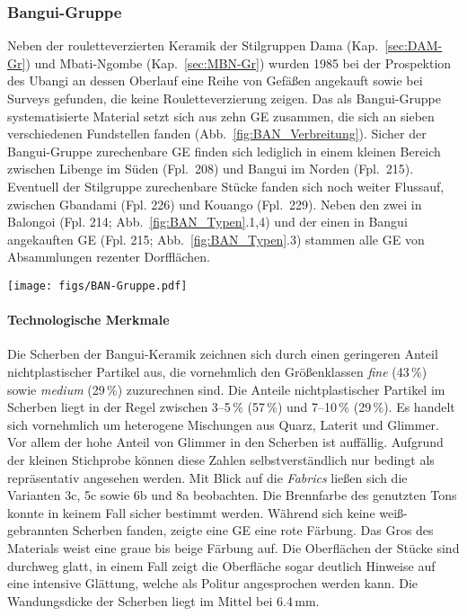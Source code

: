 \subsubsection{Bangui-Gruppe}\label{sec:BAN-Gr}

Neben der rouletteverzierten Keramik der Stilgruppen Dama (Kap.~\ref{sec:DAM-Gr}) und Mbati-Ngombe (Kap.~\ref{sec:MBN-Gr}) wurden 1985 bei der Prospektion des Ubangi an dessen Oberlauf eine Reihe von Gefäßen angekauft sowie bei Surveys gefunden, die keine Rouletteverzierung zeigen. Das als Bangui-Gruppe systematisierte Material setzt sich aus zehn GE zusammen, die sich an sieben verschiedenen Fundstellen fanden (Abb.~\ref{fig:BAN_Verbreitung}). Sicher der Bangui-Gruppe zurechenbare GE finden sich lediglich in einem kleinen Bereich zwischen Libenge im Süden (Fpl.~208) und Bangui im Norden (Fpl.~215). Eventuell der Stilgruppe zurechenbare Stücke fanden sich noch weiter Flussauf, zwischen Gbandami (Fpl. 226) und Kouango (Fpl.~229). Neben den zwei in Balongoi (Fpl. 214; Abb.~\ref{fig:BAN_Typen}.1,4) und der einen in Bangui angekauften GE (Fpl. 215; Abb.~\ref{fig:BAN_Typen}.3) stammen alle GE von Absammlungen rezenter Dorfflächen.

\begin{figure*}[tb]
	\centering
	\texttt{[image: figs/BAN-Gruppe.pdf]}
	\caption{Bangui-Gruppe: Typvertreter.\\{\footnotesize 1:~Taf.~20.7; 2:~Taf.~16.1; 3:~Taf.~21.1; 4:~Taf.~20.8.}}
	\label{fig:BAN_Typen}
\end{figure*}
\clearpage
\paragraph{Technologische Merkmale}
$\;$ \\
Die Scherben der Bangui-Keramik zeichnen sich durch einen geringeren Anteil nichtplastischer Partikel aus, die vornehmlich den Größenklassen \textit{fine} (43\,\%) sowie \textit{medium} (29\,\%) zuzurechnen sind. Die Anteile nichtplastischer Partikel im Scherben liegt in der Regel zwischen 3--5\,\% (57\,\%) und 7--10\,\% (29\,\%). Es handelt sich vornehmlich um heterogene Mischungen aus Quarz, Laterit und Glimmer. Vor allem der hohe Anteil von Glimmer in den Scherben ist auffällig. Aufgrund der kleinen Stichprobe können diese Zahlen selbstverständlich nur bedingt als repräsentativ angesehen werden. Mit Blick auf die \textit{Fabrics} ließen sich die Varianten 3c, 5c sowie 6b und 8a beobachten. Die Brennfarbe des genutzten Tons konnte in keinem Fall sicher bestimmt werden. Während sich keine weiß-gebrannten Scherben fanden, zeigte eine GE eine rote Färbung. Das Gros des Materials weist eine graue bis beige Färbung auf. Die Oberflächen der Stücke sind durchweg glatt, in einem Fall zeigt die Oberfläche sogar deutlich Hinweise auf eine intensive Glättung, welche als Politur angesprochen werden kann. Die Wandungsdicke der Scherben liegt im Mittel bei 6.4\,mm.

